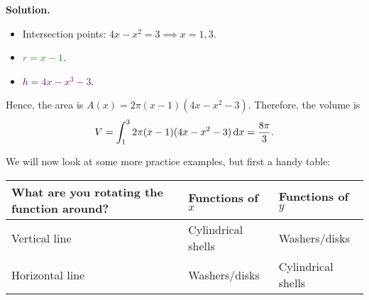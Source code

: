 \begin{Example}{}{}
\begin{enumerate}[label=(\roman*)]
\begin{center}
              \end{center}
              \textbf{Solution.}
              \begin{itemize}
                  \item Intersection points: $ 4x-x^2=3\implies x=1,3 $.
                  \item \textcolor{ForestGreen}{$ r=x-1 $}.
                  \item \textcolor{Purple}{$ h=4x-x^3-3 $}.
              \end{itemize}
              Hence, the area is $ A(x)=2\pi(x-1)(4x-x^2-3) $. Therefore, the volume is
              \[ V
                  =\int_{1}^{3}2\pi(x-1)(4x-x^2-3)\odif{x}
                  =\frac{8\pi}{3}. \]
    \end{enumerate}
\end{Example}

We will now look at some more practice examples, but first a handy table:

\begin{table}[H]
    \centering
    \begin{tabularx}{0.7\linewidth}{@{}YYY@{}}
        What are you rotating the function around? & Functions of $ x $ & Functions of $ y $ \\
        \midrule
        Vertical line                              & Cylindrical shells & Washers/disks      \\
        Horizontal line                            & Washers/disks      & Cylindrical shells
    \end{tabularx}
\end{table}

